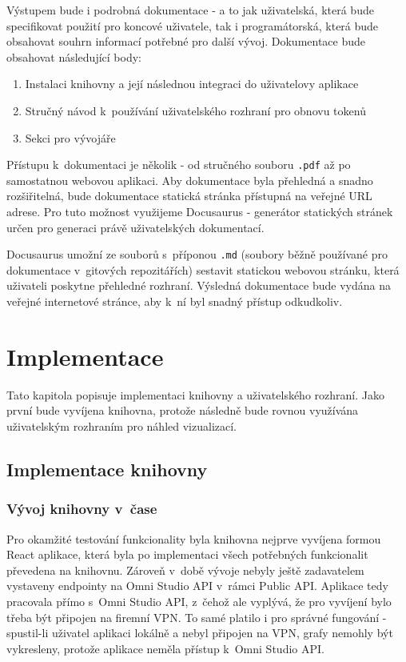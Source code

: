 \documentclass[czech, bc, kiv, he, iso690numb]{fasthesis}
\begin{document}
Výstupem bude i podrobná dokumentace - a to jak uživatelská, která bude specifikovat použití pro koncové uživatele, tak i programátorská, která bude obsahovat souhrn informací potřebné
pro další vývoj. Dokumentace bude obsahovat následující body:

\begin{enumerate}
	\item Instalaci knihovny a její následnou integraci do uživatelovy aplikace
	\item Stručný návod k~používání uživatelského rozhraní pro obnovu tokenů
	\item Sekci pro vývojáře
\end{enumerate}

Přístupu k~dokumentaci je několik - od stručného souboru \texttt{.pdf} až po samostatnou webovou aplikaci. Aby dokumentace byla přehledná a snadno rozšiřitelná, bude dokumentace statická stránka
přístupná na veřejné URL adrese. Pro tuto možnost využijeme Docusaurus - generátor statických stránek určen pro generaci právě uživatelských dokumentací. 

Docusaurus umožní ze souborů s~příponou \texttt{.md} (soubory běžně používané pro dokumentace v~gitových repozitářích) sestavit statickou webovou stránku, která uživateli poskytne přehledné 
rozhraní. Výsledná dokumentace bude vydána na veřejné internetové stránce, aby k~ní byl snadný přístup odkudkoliv.


\chapter{Implementace}
Tato kapitola popisuje implementaci knihovny a uživatelského rozhraní. Jako první bude vyvíjena knihovna, protože následně bude rovnou využívána uživatelským rozhraním pro
náhled vizualizací.

\section{Implementace knihovny}

\subsection{Vývoj knihovny v~čase}

Pro okamžité testování funkcionality byla knihovna nejprve vyvíjena formou React aplikace, která byla po implementaci všech potřebných funkcionalit převedena na knihovnu.
Zároveň v~době vývoje nebyly ještě zadavatelem vystaveny endpointy na Omni Studio API v~rámci Public API. Aplikace tedy pracovala přímo s~Omni Studio API, z~čehož ale vyplývá,
že pro vyvíjení bylo třeba být připojen na firemní VPN. To samé platilo i pro správné fungování - spustil-li uživatel aplikaci lokálně a nebyl připojen na VPN, grafy nemohly být vykresleny,
protože aplikace neměla přístup k~Omni Studio API. 
\end{document}
